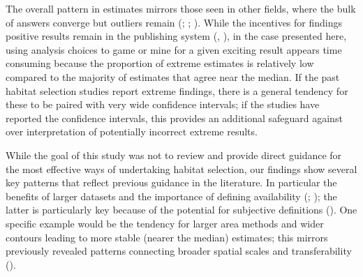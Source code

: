 \documentclass[10pt,a4paper]{article}
\begin{document}
The overall pattern in estimates mirrors those seen in other fields, where the bulk of answers converge but outliers remain (; ; ).
While the incentives for findings positive results remain in the publishing system (, ), in the case presented here, using analysis choices to game or mine for a given exciting result appears time consuming because the proportion of extreme estimates is relatively low compared to the majority of estimates that agree near the median.
If the past habitat selection studies report extreme findings, there is a general tendency for these to be paired with very wide confidence intervals; if the studies have reported the confidence intervals, this provides an additional safeguard against over interpretation of potentially incorrect extreme results.

While the goal of this study was not to review and provide direct guidance for the most effective ways of undertaking habitat selection, our findings show several key patterns that reflect previous guidance in the literature.
In particular the benefits of larger datasets and the importance of defining availability (; ); the latter is particularly key because of the potential for subjective definitions ().
One specific example would be the tendency for larger area methods and wider contours leading to more stable (nearer the median) estimates; this mirrors previously revealed patterns connecting broader spatial scales and transferability ().
\end{document}
